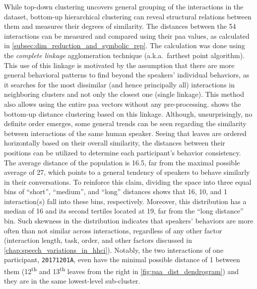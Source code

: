While top-down clustering uncovers general grouping of the interactions in the dataset, bottom-up hierarchical clustering can reveal structural relations between them and measures their degrees of similarity.
The distances between the 54 interactions can be measured and compared using their \ac{paa} values, as calculated in \cref{subsec:dim_reduction_and_symbolic_rep}.
The calculation was done using the \emph{complete linkage} agglomeration technique (a.k.a.\ farthest point algorithm).
This use of this linkage is motivated by the assumption that there are more general behavioral patterns to find beyond the speakers' individual behaviors, as it searches for the most dissimilar (and hence principally all) interactions in neighboring clusters and not only the closest one (single linkage).
This method also allows using the entire \ac{paa} vectors without any pre-processing.
 shows the bottom-up distance clustering based on this linkage. 
Although, unsurprisingly, no definite order emerges, some general trends can be seen regarding the similarity between interactions of the same human speaker.
Seeing that leaves are ordered horizontally based on their overall similarity, the distances between their positions can be utilized to determine each participant's behavior consistency.
The average distance of the population is 16.5, far from the maximal possible average of 27, which points to a general tendency of speakers to behave similarly in their conversations.
To reinforce this claim, dividing the space into three equal bins of \enquote{short}, \enquote{medium}, and \enquote{long} distances shows that 16, 10, and 1 interaction(s) fall into these bins, respectively.
Moreover, this distribution has a median of 16 and its second tertiles located at 19, far from the \enquote{long distance} bin.
Such skewness in the distribution indicates that speakers' behaviors are more often than not similar across interactions, regardless of any other factor (interaction length, task, order, and other factors discussed in \cref{chap:speech_variations_in_hhci}).
Notably, the two interactions of one participant, \texttt{20171201A}, even have the minimal possible distance of 1 between them (12\textsuperscript{th} and 13\textsuperscript{th} leaves from the right in \cref{fig:paa_dist_dendrogram}) and they are in the same lowest-level sub-cluster.

